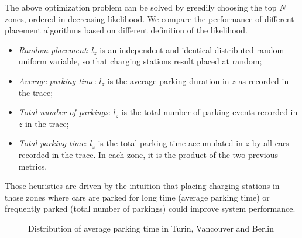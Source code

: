 The above optimization problem can be solved by greedily choosing the top $N$ zones, ordered in decreasing likelihood. We compare the performance of different placement algorithms based on different definition of the likelihood.
\begin{itemize}
	\item{\it Random placement}: $l_z$ is an independent and identical distributed random uniform variable, so that charging stations result placed at random;
	\item{\it Average parking time}: $l_z$ is the average parking duration in $z$ as recorded in the trace;
	\item{\it Total number of parkings}: $l_z$ is the total number of parking events recorded in $z$ in the trace;
	\item{\it Total parking time}: $l_z$ is the total parking time accumulated in $z$ by all cars recorded in the trace. In each zone, it is the product of the two previous metrics.
\end{itemize}
Those heuristics are driven by the intuition that placing charging stations in those zones where cars are parked for long time (average parking time) or frequently parked (total number of parkings) could improve system performance.


\begin{figure}[th]
	\centering     %
	\quad
	\quad
	\caption{Distribution of average parking time in Turin, Vancouver and Berlin}
	\label{fig:5_4_heatmap_avgparking}
\end{figure}


